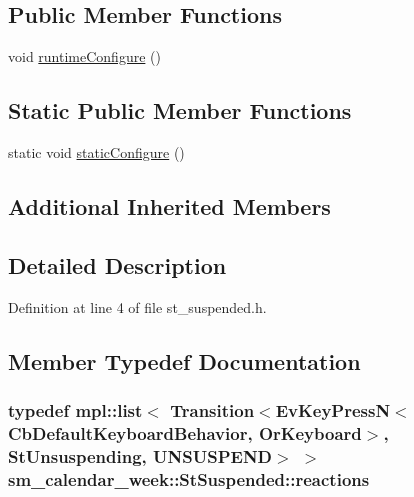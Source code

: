\subsection*{Public Member Functions}
\begin{DoxyCompactItemize}
\item 
void \hyperlink{structsm__calendar__week_1_1StSuspended_ada6bc7abd30494522a0e5493d01508ec}{runtime\+Configure} ()
\end{DoxyCompactItemize}
\subsection*{Static Public Member Functions}
\begin{DoxyCompactItemize}
\item 
static void \hyperlink{structsm__calendar__week_1_1StSuspended_a79c85d7f22f5ef5184776aac0f521cba}{static\+Configure} ()
\end{DoxyCompactItemize}
\subsection*{Additional Inherited Members}


\subsection{Detailed Description}


Definition at line 4 of file st\+\_\+suspended.\+h.



\subsection{Member Typedef Documentation}
\subsubsection[{\texorpdfstring{reactions}{reactions}}]{\setlength{\rightskip}{0pt plus 5cm}typedef mpl\+::list$<$ Transition$<$Ev\+Key\+PressN$<$Cb\+Default\+Keyboard\+Behavior, {\bf Or\+Keyboard}$>$, {\bf St\+Unsuspending}, {\bf U\+N\+S\+U\+S\+P\+E\+ND}$>$ $>$ {\bf sm\+\_\+calendar\+\_\+week\+::\+St\+Suspended\+::reactions}}\hypertarget{structsm__calendar__week_1_1StSuspended_a686126739b844903b41dea3b8601f318}{}\label{structsm__calendar__week_1_1StSuspended_a686126739b844903b41dea3b8601f318}


